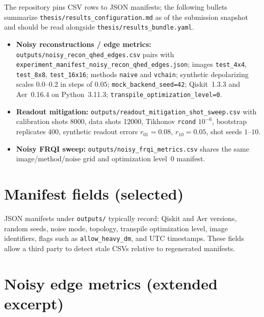 The repository pins CSV rows to JSON manifests; the following bullets summarize \texttt{thesis/results\_configuration.md} as of the submission snapshot and should be read alongside \texttt{thesis/results\_bundle.yaml}.

\begin{itemize}[leftmargin=*]
  \item \textbf{Noisy reconstructions / edge metrics:} \texttt{outputs/noisy\_recon\_qhed\_edges.csv} pairs with \texttt{experiment\_manifest\_noisy\_recon\_qhed\_edges.json}; images \texttt{test\_4x4}, \texttt{test\_8x8}, \texttt{test\_16x16}; methods \texttt{naive} and \texttt{vchain}; synthetic depolarizing scales $0.0$--$0.2$ in steps of $0.05$; \texttt{mock\_backend\_seed=42}; Qiskit~1.3.3 and Aer~0.16.4 on Python~3.11.3; \texttt{transpile\_optimization\_level=0}.
  \item \textbf{Readout mitigation:} \texttt{outputs/readout\_mitigation\_shot\_sweep.csv} with calibration shots 8000, data shots 12000, Tikhonov \texttt{rcond} $10^{-6}$, bootstrap replicates 400, synthetic readout errors $r_{01}=0.08$, $r_{10}=0.05$, shot seeds $1$--$10$.
  \item \textbf{Noisy FRQI sweep:} \texttt{outputs/noisy\_frqi\_metrics.csv} shares the same image/method/noise grid and optimization level~0 manifest.
\end{itemize}

\chapter{Manifest fields (selected)}

JSON manifests under \texttt{outputs/} typically record: Qiskit and Aer versions, random seeds, noise mode, topology, transpile optimization level, image identifiers, flags such as \texttt{allow\_heavy\_dm}, and UTC timestamps. These fields allow a third party to detect stale CSVs relative to regenerated manifests.

\chapter{Noisy edge metrics (extended excerpt)}

